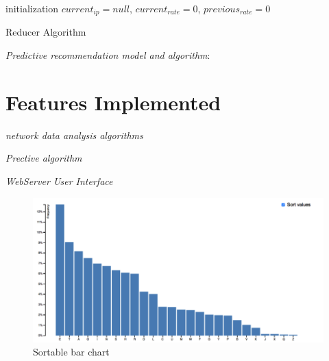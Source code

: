 \documentclass[conference]{IEEEtran}
\begin{document}
\IncMargin{1em}
\LinesNumbered
\begin{algorithm}[!ht]

	initialization  $current_{ip}=null$, $current_{rate}=0$, $previous_{rate}=0$ \;
    	
    \caption{Reducer Algorithm}
    \label{mapper_algorithm}
\end{algorithm}
\DecMargin{1em}


\emph{Predictive recommendation model and algorithm}:


\section{Features Implemented}
\emph{network data analysis algorithms}

\emph{Prective algorithm}

\emph{WebServer User Interface}

\begin{figure}[!ht]
\centering
\includegraphics[scale = 0.6]{figure/sortable}
\caption{Sortable bar chart}
\label{arch_drawing}
\vspace{-.1in}
\end{figure}
\end{document}
